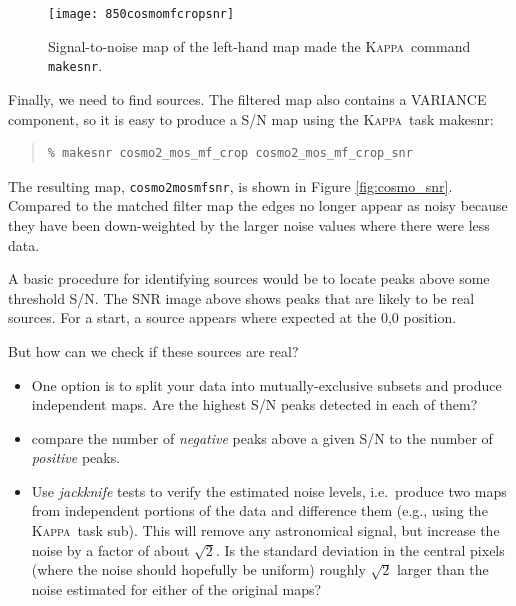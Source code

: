 \documentclass[twoside,11pt]{article}
\newcommand{\xref}[3]{#1}
\renewcommand{\_}{\texttt{\symbol{95}}}
\newenvironment{myquote}{\begin{quote}\begin{small}}{\end{small}\end{quote}}
\newcommand{\Kappa}{\xref{\textsc{Kappa}}{sun95}{}}
\newcommand{\task}[1]{\textsf{#1}}
\newcommand{\sub}{\xref{\task{sub}}{sun95}{SUB}}
\newcommand{\makesnr}{\xref{\task{makesnr}}{sun95}{MAKESNR}}
\begin{document}
\begin{figure}
\begin{center}
\texttt{[image: 850cosmo\_mf\_crop\_snr]}
\caption{\small Signal-to-noise map of the left-hand map made the \Kappa\ command \texttt{makesnr}.}
\label{fig:cosmo_crop}
\end{center}
\end{figure}

Finally, we need to find sources. The filtered map also contains a VARIANCE component, so it is easy to produce a S/N map using the \Kappa\ task \makesnr:

\begin{myquote}
\begin{verbatim}
% makesnr cosmo2_mos_mf_crop cosmo2_mos_mf_crop_snr
\end{verbatim}
\end{myquote}

The resulting map, \texttt{cosmo2\_mos\_mf\_snr}, is shown in Figure \ref{fig:cosmo_snr}. Compared to the matched filter map the edges no longer appear as noisy because they have been down-weighted
by the larger noise values where there were less data.

A basic procedure for identifying sources would be to locate peaks above some threshold S/N.  The SNR image above shows peaks that are likely to be real sources. For a start, a source appears where expected at the 0,0 position. 

But how can we check if these sources are real? 
\begin{itemize}

\item One option is to split your data into mutually-exclusive subsets and produce
  independent maps. Are the highest S/N peaks detected in each of
  them?
\item compare the number of {\em negative} peaks above a given S/N to the number of {\em positive} peaks.
\item Use {\em jackknife} tests to verify the estimated noise levels,
  i.e.~produce two maps from independent portions of the data and
  difference them (e.g., using the \Kappa\ task \sub). This will
  remove any astronomical signal, but increase the noise by a factor
  of about $\sqrt{2}$. Is the standard deviation in the central pixels
  (where the noise should hopefully be uniform) roughly $\sqrt{2}$
  larger than the noise estimated for either of the original maps?
\end{itemize}

\end{document}
